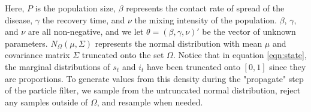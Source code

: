 \documentclass[useAMS,referee,usenatbib]{biom}
\begin{document}


%

\noindent Here, $P$ is the population size, $\beta$ represents the contact rate of spread of the disease, $\gamma$ the recovery time, and $\nu$ the mixing intensity of the population.  $\beta$, $\gamma$, and $\nu$ are all non-negative, and we let $\theta = (\beta, \gamma, \nu)'$ be the vector of unknown parameters. $N_{\Omega}(\mu,\Sigma)$ represents the normal distribution with mean $\mu$ and covariance matrix $\Sigma$ truncated onto the set $\Omega$.  Notice that in equation \eqref{eqn:state}, the marginal distributions of $s_t$ and $i_t$ have been truncated onto $[0,1]$ since they are proportions.  To generate values from this density during the "propagate" step of the particle filter, we sample from the untruncated normal distribution, reject any samples outside of $\Omega$, and resample when needed.%
\end{document}
